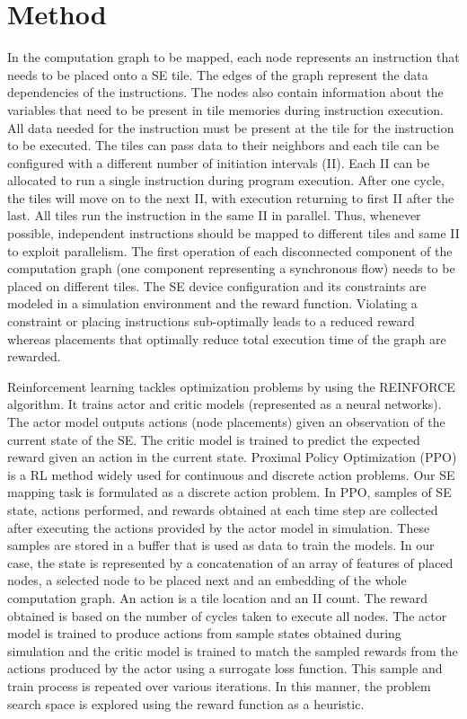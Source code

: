 \documentclass[sigplan,screen]{acmart}
\begin{document}
\section{Method}
In the computation graph to be mapped, each node represents an instruction that needs to be placed onto a SE tile. The edges of the graph represent the data dependencies of the instructions. The nodes also contain information about the variables that need to be present in tile memories during instruction execution. All data needed for the instruction must be present at the tile for the instruction to be executed. The tiles can pass data to their neighbors and each tile can be configured with a different number of initiation intervals (II). Each II can be allocated to run a single instruction during program execution. After one cycle, the tiles will move on to the next II, with execution returning to first II after the last. All tiles run the instruction in the same II in parallel. Thus, whenever possible, independent instructions should be mapped to different tiles and same II to exploit parallelism. The first operation of each disconnected component of the computation graph (one component representing a synchronous flow) needs to be placed on different tiles. The SE device configuration and its constraints are modeled in a simulation environment and the reward function. Violating a constraint or placing instructions sub-optimally leads to a reduced reward whereas placements that optimally reduce total execution time of the graph are rewarded. 

Reinforcement learning tackles optimization problems by using the REINFORCE algorithm. It trains actor and critic models (represented as a neural networks). The actor model outputs actions (node placements) given an observation of the current state of the SE. The critic model is trained to predict the expected reward given an action in the current state. Proximal Policy Optimization (PPO) is a RL method widely used for continuous and discrete action problems. Our SE mapping task is formulated as a discrete action problem. In PPO, samples of SE state, actions performed, and rewards obtained at each time step are collected after executing the actions provided by the actor model in simulation. These samples are stored in a buffer that is used as data to train the models. In our case, the state is represented by a concatenation of an array of features of placed nodes, a selected node to be placed next and an embedding of the whole computation graph. An action is a tile location and an II count. The reward obtained is based on the number of cycles taken to execute all nodes. The actor model is trained to produce actions from sample states obtained during simulation and the critic model is trained to match the sampled rewards from the actions produced by the actor using a surrogate loss function. This sample and train process is repeated over various iterations. In this manner, the problem search space is explored using the reward function as a heuristic.  
\end{document}
